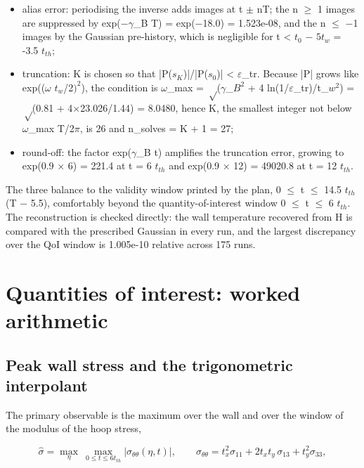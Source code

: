 \documentclass[preprint,12pt]{elsarticle}
\begin{document}
\begin{itemize}
\item alias error: periodising the inverse adds images at t $\pm$ nT; the n $\geq$ 1 images are suppressed by exp($-\gamma$\_B T) = exp($-$18.0) = 1.523e-08, and the n $\leq$ $-$1 images by the Gaussian pre-history, which is negligible for t < $t_{0}$ $-$ $5t_{w}$ = -3.5 $t_{th}$;
\item truncation: K is chosen so that |P($s_{K}$)|/|P($s_{0}$)| < $\varepsilon$\_tr. Because |P| grows like exp(($\omega$ $t_{w}$/2$)^{2}$), the condition is $\omega$\_max = $\sqrt$($\gamma$\_$B^{2}$ + 4 ln(1/$\varepsilon$\_tr)/t\_$w^{2}$) = $\sqrt$(0.81 + 4$\times$23.026/1.44) = 8.0480, hence K, the smallest integer not below $\omega$\_max T/2$\pi$, is 26 and n\_solves = K + 1 = 27;
\item round-off: the factor exp($\gamma$\_B t) amplifies the truncation error, growing to exp(0.9 $\times$ 6) = 221.4 at t = 6 $t_{th}$ and exp(0.9 $\times$ 12) = 49020.8 at t = 12 $t_{th}$.
\end{itemize}

The three balance to the validity window printed by the plan, 0 $\leq$ t $\leq$ 14.5 $t_{th}$ (T $-$ 5.5), comfortably beyond the quantity-of-interest window 0 $\leq$ t $\leq$ 6 $t_{th}$. The reconstruction is checked directly: the wall temperature recovered from H is compared with the prescribed Gaussian in every run, and the largest discrepancy over the QoI window is 1.005e-10 relative across 175 runs.

\section{Quantities of interest: worked arithmetic}
\label{sec:9}

\subsection{Peak wall stress and the trigonometric interpolant}
\label{sec:9.1}

The primary observable is the maximum over the wall and over the window of the modulus of the hoop stress,

\begin{equation}
\hat\sigma=\max_{\eta}\ \max_{0\leq t\leq 6t_{th}}\left|\sigma_{\theta\theta}(\eta,t)\right|,\qquad \sigma_{\theta\theta}=t_x^2\sigma_{11}+2t_x t_y\,\sigma_{13}+t_y^2\sigma_{33}, 
\label{eq:24}
\end{equation}
\end{document}
